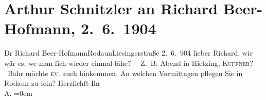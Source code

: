 

         
         \renewcommand{\erwaehntePersonen}{Personen: Hermann Bahr, Richard Beer-Hofmann}
         \renewcommand{\erwaehnteOrte}{Orte: Liesingerstraße, Ottakringer Bräu, Rodaun, Wien, XIII., Hietzing}
         \renewcommand{\erwaehnteWerke}{}
               \section[Arthur Schnitzler an Richard Beer-Hofmann, 2. 6. 1904]{ Arthur Schnitzler an Richard Beer-Hofmann, 2. 6. 1904}\nopagebreak{}\rehead{ }\begin{ledgroupsized}[t]{13cm}\normalsize\beginnumbering \toendnotes[C]{\smallbreak\pagebreak[2]} 
\toendnotes[C]{\smallbreak}\pstart{}{\pb}Dr Richard Beer-Hofmann\pend{}\pstart{}Rodaun\pend{}\pstart{}Liesingerstraße\pend{}{\bigskip}\pstart
           \raggedleft{}{\pb}2. 6. 904\pend
           \pstart
           lieber Richard, wie wär es, we{\geminationn} man
               ſich wieder einmal ſähe? – Z. B. \label{K_L01404_1v}\label{K_L01404_1h}{ }Abend in Hietzing, \textsc{Kuffner}?\pend
           \pstart
           – Bahr möchte \textsc{ev.}
               auch hinkommen. An welchen Vormittagen pflegen Sie in Rodaun zu ſein?\pend
           \pstart
           Herzlichſt Ihr{\\[\baselineskip]}\spacefill\mbox{A.}\pend
           \leftskip=0em{}
         
         \endnumbering{}\end{ledgroupsized}  \newcommand{\dateiname}{L01404}\newcommand{\titel}{Arthur Schnitzler an Richard Beer-Hofmann, 2. 6. 1904}\newcommand{\editorInnen}{Martin Anton Müller und Gerd-Hermann Susen}
      